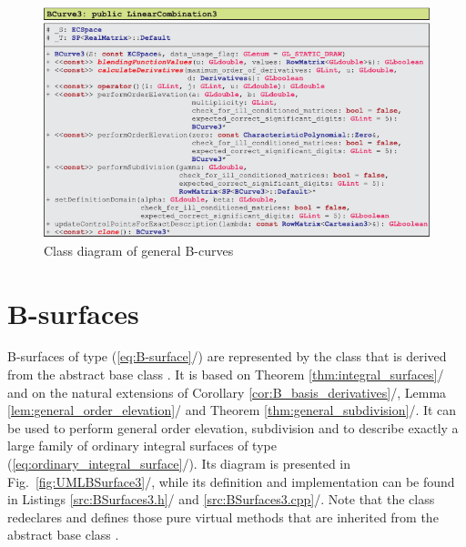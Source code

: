 \documentclass[b5paper, twosided]{book}
\newcommand{\CBlue}[1]{{\color[rgb]{0.0, 0.0, 0.9}{#1}}}
\DeclareRobustCommand{\mref}[1]{\ref{#1}{\relsize{-1}/\pageref{#1}}}
\begin{document}
\begin{figure}[!h]
	\centering
	\includegraphics[]{images/UMLBCurve3.pdf}
	\caption{Class diagram of general B-curves}
	\label{fig:UMLBCurve3}
\end{figure}


\newpage


\section{B-surfaces}

B-surfaces of type (\mref{eq:B-surface}) are represented by the class \CBlue{BSurface3} that is derived from the abstract base class \CBlue{TensorProductSurface3}. It is based on Theorem \mref{thm:integral_surfaces} and on the natural extensions of Corollary \mref{cor:B_basis_derivatives}, Lemma \mref{lem:general_order_elevation} and Theorem \mref{thm:general_subdivision}. It can be used to perform general order elevation, subdivision and to describe exactly a large family of ordinary integral surfaces of type (\mref{eq:ordinary_integral_surface}). Its diagram is presented in Fig.\ \mref{fig:UMLBSurface3}, while its definition and implementation can be found in Listings \mref{src:BSurfaces3.h} and \mref{src:BSurfaces3.cpp}. Note that the class redeclares and defines those pure virtual methods that are inherited from the abstract base class \CBlue{TensorProductSurface3}.
\end{document}
